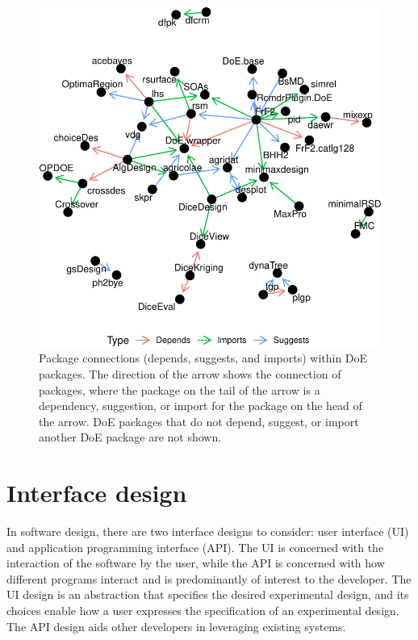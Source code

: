 \begin{figure}[htbp]

{\centering \includegraphics{figures/plot-doe-network-1} 

}

\caption{Package connections (depends, suggests, and imports) within DoE packages. The direction of the arrow shows the connection of packages, where the package on the tail of the arrow is a dependency, suggestion, or import for the package on the head of the arrow.  DoE packages that do not depend, suggest, or import another DoE package are not shown.}\label{fig:plot-doe-network}
\end{figure}

\hypertarget{design}{%
\section{Interface design}\label{design}}

In software design, there are two interface designs to consider: user interface (UI) and application programming interface (API). The UI is concerned with the interaction of the software by the user, while the API is concerned with how different programs interact and is predominantly of interest to the developer. The UI design is an abstraction that specifies the desired experimental design, and its choices enable how a user expresses the specification of an experimental design. The API design aids other developers in leveraging existing systems.

